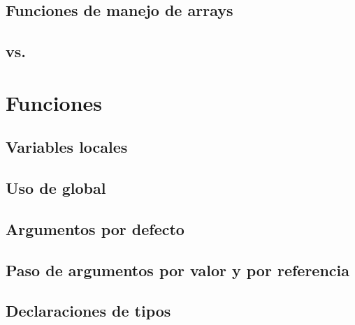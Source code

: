 \documentclass[a4paper,11pt,spanish]{sphinxmanual}
\begin{document}
\subsection{Funciones de manejo de arrays}
\label{\detokenize{php:funciones-de-manejo-de-arrays}}

\subsection{}
\label{\detokenize{php:foreach}}

\subsection{ vs. }
\label{\detokenize{php:isset-vs-array-key-exists}}

\section{Funciones}
\label{\detokenize{php:funciones}}

\subsection{Variables locales}
\label{\detokenize{php:variables-locales}}

\subsection{Uso de global}
\label{\detokenize{php:uso-de-global}}

\subsection{Argumentos por defecto}
\label{\detokenize{php:argumentos-por-defecto}}

\subsection{Paso de argumentos por valor y por referencia}
\label{\detokenize{php:paso-de-argumentos-por-valor-y-por-referencia}}

\subsection{Declaraciones de tipos}
\label{\detokenize{php:declaraciones-de-tipos}}
\end{document}
